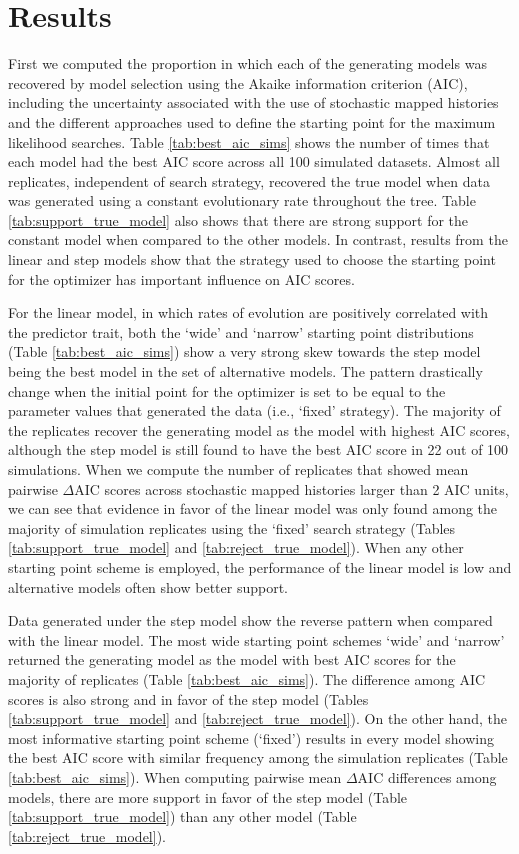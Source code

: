 \section{Results}

First we computed the proportion in which each of the generating models was recovered by model selection using the Akaike information criterion (AIC), including the uncertainty associated with the use of stochastic mapped histories and the different approaches used to define the starting point for the maximum likelihood searches. Table \ref{tab:best_aic_sims} shows the number of times that each model had the best AIC score across all 100 simulated datasets. Almost all replicates, independent of search strategy, recovered the true model when data was generated using a constant evolutionary rate throughout the tree. Table \ref{tab:support_true_model} also shows that there are strong support for the constant model when compared to the other models. In contrast, results from the linear and step models show that the strategy used to choose the starting point for the optimizer has important influence on AIC scores.

For the linear model, in which rates of evolution are positively correlated with the predictor trait, both the `wide' and `narrow' starting point distributions (Table \ref{tab:best_aic_sims}) show a very strong skew towards the step model being the best model in the set of alternative models. The pattern drastically change when the initial point for the optimizer is set to be equal to the parameter values that generated the data (i.e., `fixed' strategy). The majority of the replicates recover the generating model as the model with highest AIC scores, although the step model is still found to have the best AIC score in 22 out of 100 simulations. When we compute the number of replicates that showed mean pairwise $\Delta$AIC scores across stochastic mapped histories larger than 2 AIC units, we can see that evidence in favor of the linear model was only found among the majority of simulation replicates using the `fixed' search strategy (Tables \ref{tab:support_true_model} and \ref{tab:reject_true_model}). When any other starting point scheme is employed, the performance of the linear model is low and alternative models often show better support.

Data generated under the step model show the reverse pattern when compared with the linear model. The most wide starting point schemes `wide' and `narrow' returned the generating model as the model with best AIC scores for the majority of replicates (Table \ref{tab:best_aic_sims}). The difference among AIC scores is also strong and in favor of the step model (Tables \ref{tab:support_true_model} and \ref{tab:reject_true_model}). On the other hand, the most informative starting point scheme (`fixed') results in every model showing the best AIC score with similar frequency among the simulation replicates (Table \ref{tab:best_aic_sims}). When computing pairwise mean $\Delta$AIC differences among models, there are more support in favor of the step model (Table \ref{tab:support_true_model}) than any other model (Table \ref{tab:reject_true_model}).


